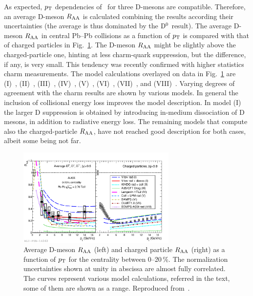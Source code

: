  As expected, $p_{\rm T}$ dependencies of \Raa\ for three D-mesons are compatible. Therefore, an average D-meson $R_{\rm AA}$ is calculated combining the results according their uncertainties (the average is thus dominated by the ${\rm D}^0$ result). The average D-meson $R_{\rm AA}$ in central Pb--Pb collisions as a function of $p_{\rm T}$ is compared with that of charged particles in Fig.~\ref{figks:DmesonRAA}. The D-meson $R_{\rm AA}$ might be slightly above the charged-particle one, hinting at less charm-quark suppression, but the difference, if any, is very small. This tendency was recently confirmed with higher statistics charm measurements. The model calculations overlayed on data in Fig.~\ref{figks:DmesonRAA} are (I)~\cite{Sharma:2009hn,He:2011pd}, (II)~\cite{Horowitz:2011cv}, (III)~\cite{Horowitz:2011wm}, (IV)~\cite{Alberico:2011zy,Monteno:2011gq}, (V)~\cite{Gossiaux:2009mk,Gossiaux:2010yx}, (VI)~\cite{Fochler:2011en}, (VII)~\cite{Buzzatti:2011vt}, and (VIII)~\cite{Armesto:2005iq}. Varying degrees of agreement with the charm results are shown by various models. In general the inclusion of collisional energy loss improves the model description. In model (I) the larger D suppression is obtained by introducing in-medium dissociation of D mesons, in addition to radiative energy loss. The remaining models that compute also the charged-particle $R_{\rm AA}$, have not reached good description for both cases, albeit some being not far.

\begin{figure}
\centering
\includegraphics[width=0.7\textwidth]{heavyflavorfigs/DmesonChargedRAAmodels.pdf}
\caption{Average D-meson $R_{\rm AA}$ (left) and charged particle $R_{\rm AA}$ (right) as a function of $p_{\rm T}$ for the centrality between 0--20\,\%. The normalization uncertainties shown at unity in abscissa are almost fully correlated. The curves represent various model calculations, referred in the text, some of them are shown as a range. Reproduced from~\cite{ALICE:2012ab}.}
\label{figks:DmesonRAA}
\end{figure}

